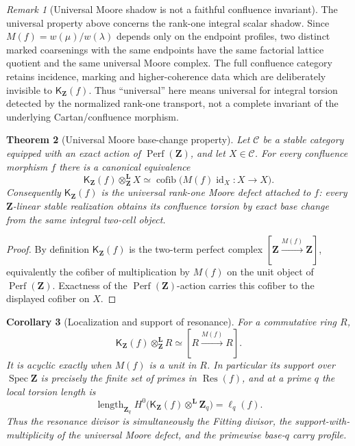 \documentclass[11pt]{article}
\newtheorem{theorem}{Theorem}[section]
\newtheorem{corollary}[theorem]{Corollary}
\theoremstyle{remark}
\newtheorem{remark}[theorem]{Remark}
\newcommand{\Z}{\mathbf Z}
\begin{document}
\begin{remark}[Universal Moore shadow is not a faithful confluence invariant]\label{P1C-rem:universal-shadow-not-faithful}
The universal property above concerns the rank-one integral scalar shadow.  Since
$M(f)=w(\mu)/w(\lambda)$ depends only on the endpoint profiles, two distinct marked
coarsenings with the same endpoints have the same factorial lattice quotient and the same
universal Moore complex.  The full confluence category retains incidence, marking and higher-coherence
data which are deliberately invisible to $\mathsf K_{\Z}(f)$.  Thus ``universal'' here means universal
for integral torsion detected by the normalized rank-one transport, not a complete invariant of the
underlying Cartan/confluence morphism.
\end{remark}

\begin{theorem}[Universal Moore base-change property]\label{P1C-thm:universal-moore-base-change}
Let $\mathcal C$ be a stable category equipped with an exact action of
$\operatorname{Perf}(\Z)$, and let $X\in\mathcal C$.  For every confluence morphism $f$ there is a
canonical equivalence
\[
 \boxed{
 \mathsf K_{\Z}(f)\otimes^{\mathbf L}_{\Z}X
 \simeq
 \operatorname{cofib}\bigl(M(f)\operatorname{id}_X:X\to X\bigr).}
\]
Consequently $\mathsf K_{\Z}(f)$ is the universal rank-one Moore defect attached to $f$: every
$\Z$-linear stable realization obtains its confluence torsion by exact base change from the same
integral two-cell object.
\end{theorem}

\begin{proof}
By definition $\mathsf K_{\Z}(f)$ is the two-term perfect complex
$[\Z\xrightarrow{M(f)}\Z]$, equivalently the cofiber of multiplication by $M(f)$ on the unit
object of $\operatorname{Perf}(\Z)$.  Exactness of the $\operatorname{Perf}(\Z)$-action carries this
cofiber to the displayed cofiber on $X$.
\end{proof}

\begin{corollary}[Localization and support of resonance]\label{P1C-cor:resonance-support}
For a commutative ring $R$,
\[
 \mathsf K_{\Z}(f)\otimes^{\mathbf L}_{\Z}R
 \simeq [R\xrightarrow{M(f)}R].
\]
It is acyclic exactly when $M(f)$ is a unit in $R$.  In particular its support over
$\operatorname{Spec}\Z$ is precisely the finite set of primes in $\operatorname{Res}(f)$, and at a
prime $q$ the local torsion length is
\[
 \boxed{
 \operatorname{length}_{\Z_q}H^0
 \bigl(\mathsf K_{\Z}(f)\otimes^{\mathbf L}\Z_q\bigr)
 =\ell_q(f).}
\]
Thus the resonance divisor is simultaneously the Fitting divisor, the support-with-multiplicity of
the universal Moore defect, and the primewise base-$q$ carry profile.
\end{corollary}
\end{document}

